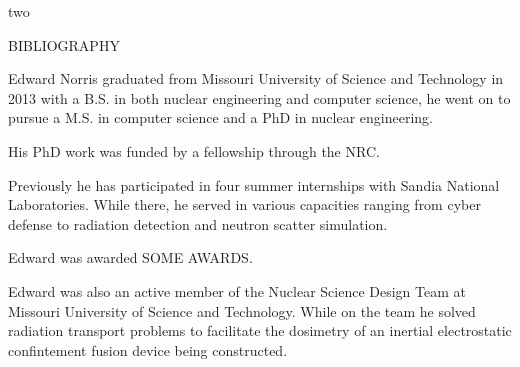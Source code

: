 \documentclass[times,12pt,titlepage]{mstthesis}
\begin{document}
\begin{ThesisBody}



 

\end{ThesisBody}

\begin{ThesisAppendix}{two}



\end{ThesisAppendix}


\begin{ThesisBibliography}{BIBLIOGRAPHY}


\end{ThesisBibliography}


\begin{Vita}
Edward Norris graduated from Missouri University of Science and Technology in 2013 with a B.S. in both nuclear engineering and computer science, he went on to pursue a M.S. in computer science and a PhD in nuclear engineering.

His PhD work was funded by a fellowship through the NRC.

Previously he has participated in four summer internships with Sandia National Laboratories. While there, he served in various capacities ranging from cyber defense to radiation detection and neutron scatter simulation.

Edward was awarded SOME AWARDS.

Edward was also an active member of the Nuclear Science Design Team at Missouri University of Science and Technology. While on the team he solved radiation transport problems to facilitate the dosimetry of an inertial electrostatic confintement fusion device being constructed.


\end{Vita}
\end{document}

